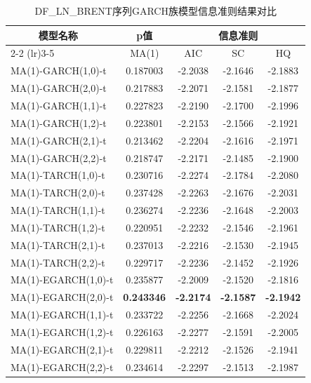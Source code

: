 \documentclass[12pt,a4paper]{ctexart}
\begin{document}
\begin{table}[H]
\centering
\caption{DF\_LN\_BRENT序列GARCH族模型信息准则结果对比}
\label{tab:brent_garch_criteria}
\setlength{\tabcolsep}{4pt}  %
\begin{tabular}{lcccc}
\toprule[1.2pt]
\multirow{2}{*}{$\quad\quad\,\,\,\,\,$模型名称} & \multicolumn{1}{c}{p值} & \multicolumn{3}{c}{信息准则} \\
\cmidrule(lr){2-2} \cmidrule(lr){3-5}
& MA(1) & AIC & SC & HQ \\
\midrule[0.75pt]
MA(1)-GARCH(1,0)-t & 0.187003 & -2.2038 & -2.1646 & -2.1883 \\
MA(1)-GARCH(2,0)-t & 0.217883 & -2.2071 & -2.1581 & -2.1877 \\
MA(1)-GARCH(1,1)-t & 0.227823 & -2.2190 & -2.1700 & -2.1996 \\
MA(1)-GARCH(1,2)-t & 0.223801 & -2.2153 & -2.1566 & -2.1921 \\
MA(1)-GARCH(2,1)-t & 0.213462 & -2.2204 & -2.1616 & -2.1971 \\
MA(1)-GARCH(2,2)-t & 0.218747 & -2.2171 & -2.1485 & -2.1900 \\
\midrule
MA(1)-TARCH(1,0)-t & 0.230716 & -2.2274 & -2.1784 & -2.2080 \\
MA(1)-TARCH(2,0)-t & 0.237428 & -2.2263 & -2.1676 & -2.2031 \\
MA(1)-TARCH(1,1)-t & 0.236274 & -2.2236 & -2.1648 & -2.2003 \\
MA(1)-TARCH(1,2)-t & 0.220951 & -2.2232 & -2.1546 & -2.1961 \\
MA(1)-TARCH(2,1)-t & 0.237013 & -2.2216 & -2.1530 & -2.1945 \\
MA(1)-TARCH(2,2)-t & 0.229717 & -2.2236 & -2.1452 & -2.1926 \\
\midrule
MA(1)-EGARCH(1,0)-t & 0.235877 & -2.2009 & -2.1520 & -2.1816 \\
MA(1)-EGARCH(2,0)-t & \textbf{0.243346} & \textbf{-2.2174} & \textbf{-2.1587} & \textbf{-2.1942} \\
MA(1)-EGARCH(1,1)-t & 0.233722 & -2.2256 & -2.1668 & -2.2024 \\
MA(1)-EGARCH(1,2)-t & 0.226163 & -2.2277 & -2.1591 & -2.2005 \\
MA(1)-EGARCH(2,1)-t & 0.229811 & -2.2212 & -2.1526 & -2.1941 \\
MA(1)-EGARCH(2,2)-t & 0.234614 & -2.2297 & -2.1513 & -2.1987 \\
\bottomrule[1.2pt]
\end{tabular}
\end{table}
\end{document}
